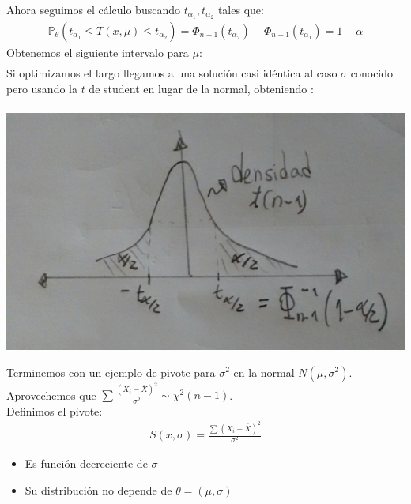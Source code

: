 \documentclass[10pt]{article}
\theoremstyle{plain}
\theoremstyle{definition}
\begin{document}
 Ahora seguimos el cálculo buscando $t_{\alpha_{1}}, t_{\alpha_{2}}$ tales que:
 \begin{align*}
 \mathbb{P}_{\theta}(t_{\alpha_{1}} \le \tilde{T}(x,\mu) \le t_{\alpha_{2}}) = \Phi_{n-1}(t_{\alpha_{2}}) - \Phi_{n-1}(t_{\alpha_{1}}) = 1-\alpha
 \end{align*}
 Obtenemos el siguiente intervalo para $\mu$:
 \begin{align*}
 [\bar{X}- t_{\alpha_{2}}\frac{\hat{\sigma}}{\sqrt{n}}, \bar{X}- t_{\alpha_{1}}\frac{\hat{\sigma}}{\sqrt{n}}]
 \end{align*}
 Si optimizamos el largo llegamos a una solución casi idéntica al caso $\sigma$ conocido pero usando la $t$ de student en lugar de la normal, obteniendo :
  \begin{align*}
 [\bar{X}- t_{\alpha/2}\frac{\hat{\sigma}}{\sqrt{n}}, \bar{X}+ t_{\alpha/2}\frac{\hat{\sigma}}{\sqrt{n}}]
 \end{align*}
 \begin{center}
 \includegraphics[scale=0.2]{imagenes/distr2.jpg}
 \end{center}
 Terminemos con un ejemplo de pivote para $\sigma^2$ en la normal $N(\mu,\sigma^2)$.\\
 Aprovechemos que $\sum {\frac{(X_{i}-\bar{X})^2}{\sigma^2}} \sim \chi^2(n-1)$.\\
 Definimos el pivote:
 \begin{align*}
 S(x,\sigma) = \frac{\sum {(X_{i}-\bar{X})^2}}{\sigma^2}
 \end{align*}
 \begin{itemize}
 \item Es función decreciente de $\sigma$
 \item Su distribución no depende de $\theta = (\mu,\sigma)$
 \end{itemize}
\end{document}

